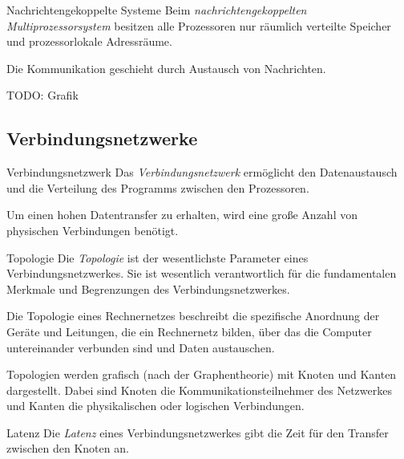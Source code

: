 \begin{defi}{Nachrichtengekoppelte Systeme}
    Beim \emph{nachrichtengekoppelten Multiprozessorsystem} besitzen alle Prozessoren nur räumlich verteilte Speicher und prozessorlokale Adressräume.

    Die Kommunikation geschieht durch Austausch von Nachrichten.

    TODO: Grafik
\end{defi}

\subsection{Verbindungsnetzwerke}

\begin{defi}{Verbindungsnetzwerk}
    Das \emph{Verbindungsnetzwerk} ermöglicht den Datenaustausch und die Verteilung des Programms zwischen den Prozessoren.

    Um einen hohen Datentransfer zu erhalten, wird eine große Anzahl von physischen Verbindungen benötigt.
\end{defi}

\begin{defi}[Verbindungsnetzwerk]{Topologie}
    Die \emph{Topologie} ist der wesentlichste Parameter eines Verbindungsnetzwerkes.
    Sie ist wesentlich verantwortlich für die fundamentalen Merkmale und Begrenzungen des Verbindungsnetzwerkes.

    Die Topologie eines Rechnernetzes beschreibt die spezifische Anordnung der Geräte und Leitungen, die ein Rechnernetz bilden, über das die Computer untereinander verbunden sind und Daten austauschen.

    Topologien werden grafisch (nach der Graphentheorie) mit Knoten und Kanten dargestellt.
    Dabei sind Knoten die Kommunikationsteilnehmer des Netzwerkes und Kanten die physikalischen oder logischen Verbindungen.
\end{defi}

\begin{defi}[Verbindungsnetzwerk]{Latenz}
    Die \emph{Latenz} eines Verbindungsnetzwerkes gibt die Zeit für den Transfer zwischen den Knoten an.
\end{defi}

